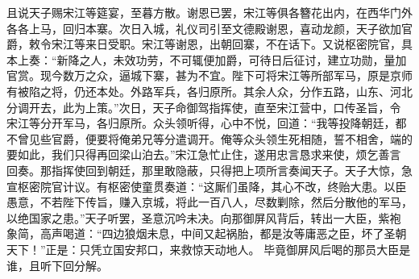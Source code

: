 且说天子赐宋江等筵宴，至暮方散。谢恩已罢，宋江等俱各簪花出内，在西华门外
各各上马，回归本寨。次日入城，礼仪司引至文德殿谢恩，喜动龙颜，天子欲加官
爵，敕令宋江等来日受职。宋江等谢恩，出朝回寨，不在话下。又说枢密院官，具
本上奏：“新降之人，未效功劳，不可辄便加爵，可待日后征讨，建立功勋，量加
官赏。现今数万之众，逼城下寨，甚为不宜。陛下可将宋江等所部军马，原是京师
有被陷之将，仍还本处。外路军兵，各归原所。其余人众，分作五路，山东、河北
分调开去，此为上策。”次日，天子命御驾指挥使，直至宋江营中，口传圣旨，令
宋江等分开军马，各归原所。众头领听得，心中不悦，回道：“我等投降朝廷，都
不曾见些官爵，便要将俺弟兄等分遣调开。俺等众头领生死相随，誓不相舍，端的
要如此，我们只得再回梁山泊去。”宋江急忙止住，遂用忠言恳求来使，烦乞善言
回奏。那指挥使回到朝廷，那里敢隐蔽，只得把上项所言奏闻天子。天子大惊，急
宣枢密院官计议。有枢密使童贯奏道：“这厮们虽降，其心不改，终贻大患。以臣
愚意，不若陛下传旨，赚入京城，将此一百八人，尽数剿除，然后分散他的军马，
以绝国家之患。”天子听罢，圣意沉吟未决。向那御屏风背后，转出一大臣，紫袍
象简，高声喝道：“四边狼烟未息，中间又起祸胎，都是汝等庸恶之臣，坏了圣朝
天下！”正是：只凭立国安邦口，来救惊天动地人。
毕竟御屏风后喝的那员大臣是谁，且听下回分解。